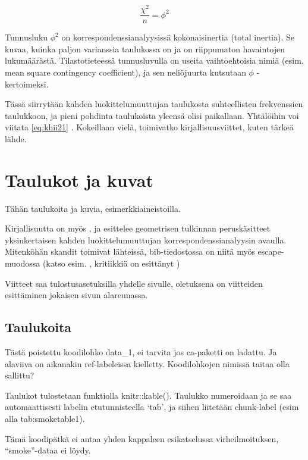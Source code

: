 \documentclass[finnish,]{book}
\theoremstyle{definition}
\theoremstyle{definition}
\theoremstyle{definition}
\theoremstyle{remark}
\begin{document}
\begin{equation}
 \frac{\chi^{2}}{n} = \phi^{2}
 \label{eq:inert1}
\end{equation}

Tunnusluku \(\phi^{2}\) on korrespondenssianalyysissä kokonaisinertia
(total inertia). Se kuvaa, kuinka paljon varianssia taulukossa on ja on
riippumaton havaintojen lukumäärästä. Tilastotieteessä tunnusluvulla on
useita vaihtoehtoisia nimiä (esim. mean square contingency coefficient),
ja sen neliöjuurta kutsutaan \(\phi\) - kertoimeksi.

Tässä siirrytään kahden luokittelumuuttujan taulukosta suhteellisten
frekvenssien taulukkoon, ja pieni pohdinta taulukoista yleensä olisi
paikallaan. Yhtälöihin voi viitata \eqref{eq:khii21} . Kokeillaan vielä,
toimivatko kirjallisuusviittet, kuten tärkeä lähde\citep{RefWorks:55}.

\hypertarget{taulukot-ja-kuvat}{%
\chapter{Taulukot ja kuvat}\label{taulukot-ja-kuvat}}

Tähän taulukoita ja kuvia, esimerkkiaineistoilla.

Kirjallisuutta on myös \citep{RefWorks:68}, ja \citep{RefWorks:57}
esittelee geometrisen tulkinnan peruskäsitteet yksinkertaisen kahden
luokittelumuuttujan korrespondenssianalyysin avaulla. Mitenköhän skandit
toimivat lähteissä, bib-tiedostossa on niitä myös escape-muodossa (katso
esim. \citep{RefWorks:100}, kritiikkiä on esittänyt
\citep{RefWorks:110})

Viitteet saa tulostusasetuksilla yhdelle sivulle, oletuksena on
viitteiden esittäminen jokaisen sivun alareunassa.

\hypertarget{taulukoita}{%
\section{Taulukoita}\label{taulukoita}}

Tästä poistettu koodilohko data\_1, ei tarvita jos ca-paketti on
ladattu. Ja alaviiva on aikanakin ref-labeleissa kielletty.
Koodilohkojen nimissä taitaa olla sallittu?

Taulukot tulostetaan funktiolla knitr::kable(). Taulukko numeroidaan ja
se saa automaattisesti labelin etutunnisteella `tab', ja siihen
liitetään chunk-label (esim alla tab:smoketable1).

Tämä koodipätkä ei antaa yhden kappaleen esikatselussa virheilmoituksen,
``smoke''-dataa ei löydy.
\end{document}

